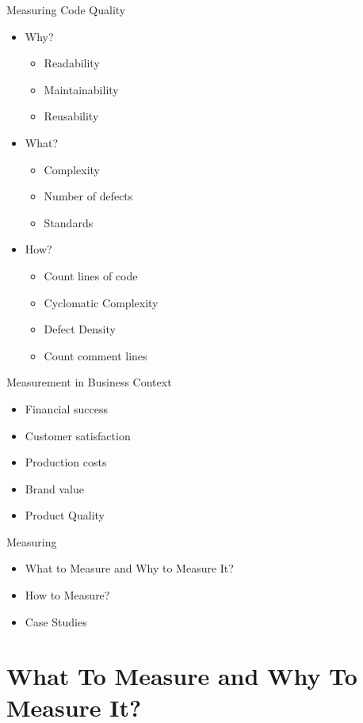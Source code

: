 \documentclass{beamer}
\begin{document}
	\begin{frame}{Measuring Code Quality}
		\begin{itemize}
			\item Why?
				\begin{itemize}
					\item Readability
					\item Maintainability
					\item Reusability
				\end{itemize}
			\item What?
				\begin{itemize}
					\item Complexity
					\item Number of defects
					\item Standards
				\end{itemize}
			\item How?
				\begin{itemize}
					\item Count lines of code
					\item Cyclomatic Complexity
					\item Defect Density
					\item Count comment lines
				\end{itemize}
		\end{itemize}
	\end{frame}

	\begin{frame}{Measurement in Business Context}
		\begin{itemize}
			\item Financial success
			\item Customer satisfaction
			\item Production costs
			\item Brand value
			\item Product Quality
		\end{itemize}
	\end{frame}

	\begin{frame}{Measuring}
		\begin{itemize}
			\item What to Measure and Why to Measure It?
			\item How to Measure?
			\item Case Studies
		\end{itemize}
	\end{frame}


	\section{What To Measure and Why To Measure It?}
	
\end{document}
